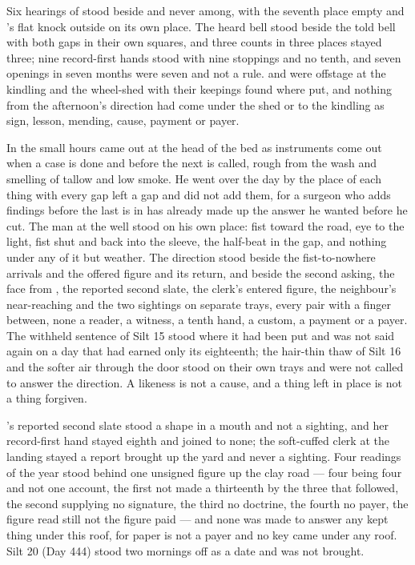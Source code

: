 Six hearings of  stood beside and never among, with the seventh place empty and 's flat knock outside on its own place. The heard bell stood beside the told bell with both gaps in their own squares, and three counts in three places stayed three; nine record-first hands stood with nine stoppings and no tenth, and seven openings in seven months were seven and not a rule.  and  were offstage at the kindling and the wheel-shed with their keepings found where put, and nothing from the afternoon's direction had come under the shed or to the kindling as sign, lesson, mending, cause, payment or payer.

\scenebreak

In the small hours  came out at the head of the bed as instruments come out when a case is done and before the next is called, rough from the wash and smelling of tallow and low smoke. He went over the day by the place of each thing with every gap left a gap and did not add them, for a surgeon who adds findings before the last is in has already made up the answer he wanted before he cut. The man at the well stood on his own place: fist toward the road, eye to the light, fist shut and back into the sleeve, the half-beat in the gap, and nothing under any of it but weather. The direction stood beside the fist-to-nowhere arrivals and the offered figure and its return, and beside the second asking, the face from , the reported second slate, the clerk's entered figure, the neighbour's near-reaching and the two sightings on separate trays, every pair with a finger between, none a reader, a witness, a tenth hand, a custom, a payment or a payer. The withheld sentence of Silt 15 stood where it had been put and was not said again on a day that had earned only its eighteenth; the hair-thin thaw of Silt 16 and the softer air through the door stood on their own trays and were not called to answer the direction. A likeness is not a cause, and a thing left in place is not a thing forgiven.

's reported second slate stood a shape in a mouth and not a sighting, and her record-first hand stayed eighth and joined to none; the soft-cuffed clerk at the landing stayed a report brought up the yard and never a sighting. Four readings of the year stood behind one unsigned figure up the clay road --- four being four and not one account, the first not made a thirteenth by the three that followed, the second supplying no signature, the third no doctrine, the fourth no payer, the figure read still not the figure paid --- and none was made to answer any kept thing under this roof, for paper is not a payer and no key came under any roof. Silt 20 (Day 444) stood two mornings off as a date and was not brought.

